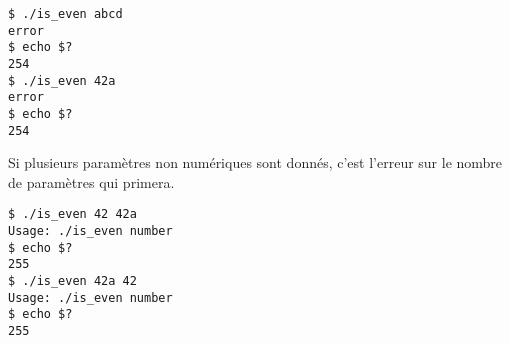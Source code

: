 \bigskip

\lstset{language=sh}
\begin{lstlisting}[frame=single,title={Cas d'erreur 2}]
$ ./is_even abcd
error
$ echo $?
254
$ ./is_even 42a
error
$ echo $?
254
\end{lstlisting}

\bigskip

\noindent Si plusieurs paramètres non numériques sont donnés, c'est l'erreur sur le nombre de paramètres qui primera.

\bigskip

\lstset{language=sh}
\begin{lstlisting}[frame=single,title={Cas d'erreur 2}]
$ ./is_even 42 42a
Usage: ./is_even number
$ echo $?
255
$ ./is_even 42a 42
Usage: ./is_even number
$ echo $?
255
\end{lstlisting}
